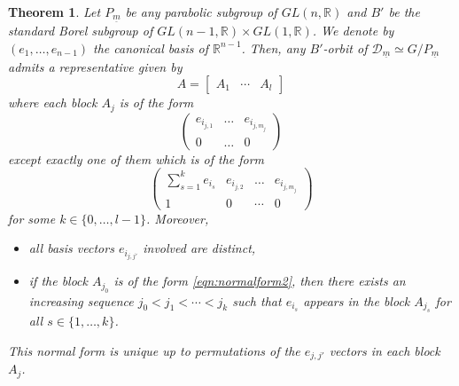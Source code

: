 \documentclass[pdftex]{sigma}
\numberwithin{equation}{section}
\theoremstyle{definition}
\newcommand{\R}{\mathbb{R}}
\theoremstyle{plain}
\theoremstyle{plain}
\theoremstyle{plain}
\newtheorem{theoremx}{Theorem}
\theoremstyle{plain}
\begin{document}
\begin{theoremx}\label{Theorem B}
	Let $P_{\underline m}$ be any parabolic subgroup of $GL(n,\R)$ and $B'$ be the standard Borel subgroup of $GL(n-1,\R) \times GL(1,\R)$. We denote by $(e_1,\dots,e_{n-1})$ the canonical basis of $\R^{n-1}$. Then, any $B'$-orbit of $\mathcal D_{\underline{m}} \simeq G/P_{\underline m}$ admits a representative given by
	\begin{equation*}
		A = \begin{bmatrix}
		A_1 & \cdots & A_{l}
	\end{bmatrix}
	\end{equation*}
	where each block $A_j$ is of the form
	\begin{equation}\label{eqn:normalform1}
		\begin{pmatrix}
			e_{i_{j,1}} & \dots & e_{i_{j,m_j}} \\
			0 & \dots & 0
		\end{pmatrix}
	\end{equation}
	except exactly one of them which is of the form
	\begin{equation}\label{eqn:normalform2}
		\begin{pmatrix}
			\displaystyle \sum_{s=1}^k e_{i_s} & e_{i_{j,2}} & \dots & e_{i_{j,m_j}} \\
			1 & 0 & \cdots & 0
		\end{pmatrix}
	\end{equation}
	for some $k \in \{0,\dots,l-1\}$. Moreover,
	\begin{itemize}[leftmargin=*, label = --]
		\item all basis vectors $e_{i_{j,j'}}$ involved are distinct,
		\item if the block $A_{j_0}$ is of the form \eqref{eqn:normalform2}, then there exists an increasing sequence $j_0 < j_1 < \cdots < j_k$ such that $e_{i_s}$ appears in the block $A_{j_s}$ for all $s \in \{1,\dots,k\}$.
	\end{itemize}
	This normal form is unique up to permutations of the $e_{j,j'}$ vectors in each block $A_j$.
\end{theoremx}
%	
%	
\end{document}
